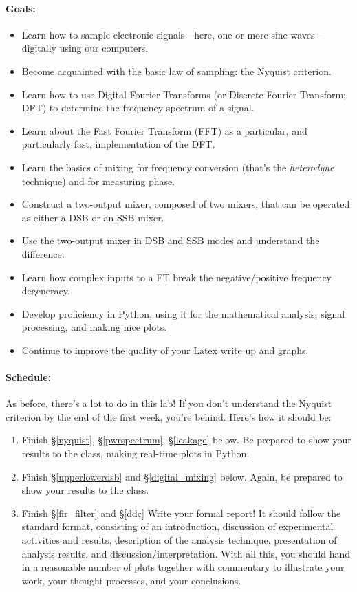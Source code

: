 \documentclass[11pt]{article}
\begin{document}
\paragraph{Goals:}
\begin{itemize}[noitemsep,nolistsep]
\item Learn how to sample electronic signals---here, one or more sine
  waves---digitally using our computers.
\item Become acquainted with the basic law of sampling: the Nyquist
  criterion.
\item Learn how to use Digital Fourier Transforms (or Discrete Fourier
  Transform; DFT) to determine the
  frequency spectrum of a signal.
\item Learn about the Fast Fourier Transform (FFT) as a particular, and
  particularly fast, implementation of the DFT.
\item Learn the basics of mixing for frequency conversion (that's
  the {\it heterodyne} technique) and for measuring phase.
\item Construct a two-output mixer, composed of two mixers, that can be
  operated as either a DSB or an SSB mixer.
\item Use the two-output mixer in DSB and SSB modes and understand the
  difference.
\item Learn how complex inputs to a FT break the negative/positive
  frequency degeneracy.
\item Develop proficiency in Python, using it for the
  mathematical analysis, signal processing, and making nice plots.
\item Continue to improve the quality of your Latex write up and graphs.
\end{itemize}

\paragraph{Schedule:}

As before, there's a lot to do in this lab! If you don't understand the Nyquist criterion
by the end of the first week, you're behind. Here's how it should be:

\begin{enumerate}
\item Finish \S \ref{nyquist},
  \S \ref{pwrspectrum}, \S \ref{leakage} below. Be prepared to show your
  results to the class, making real-time plots in Python.
\item Finish \S \ref{upperlowerdsb} and \S \ref{digital_mixing}
  below. Again, be prepared to show your results to the class.
\item Finish \S \ref{fir_filter} and \S \ref{ddc}
    Write your formal report!
  It should follow the standard format, consisting of an introduction,
  discussion of experimental activities and results, description of the
  analysis technique, presentation of analysis results, and
  discussion/interpretation. With all this, you should hand in a
  reasonable number of plots together with commentary to illustrate your
  work, your thought processes, and your conclusions.
\end{enumerate}
\end{document}
